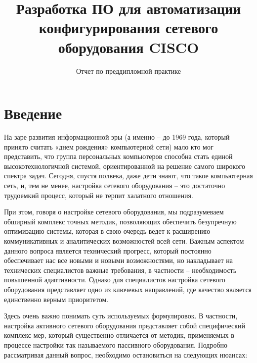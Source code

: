 \documentclass[a4paper,14pt]{extreport}
\begin{document}
	\title{Разработка ПО для автоматизации конфигурирования сетевого оборудования CISCO}
	\subtitle{Отчет по преддипломной практике}
	\maketitle
	\setcounter{page}{2} %
	
	\tableofcontents
	
	\chapter*{Введение}
		
	На заре развития информационной эры (а именно – до 1969 года, который принято считать «днем рождения» компьютерной сети) мало кто мог представить, что группа персональных компьютеров способна стать единой высокотехнологичной системой, ориентированной на решение самого широкого спектра задач. Сегодня, спустя полвека, даже дети знают, что такое компьютерная сеть, и, тем не менее, настройка сетевого оборудования – это достаточно трудоемкий процесс, который не терпит халатного отношения.
	
	При этом, говоря о настройке сетевого оборудования, мы подразумеваем обширный комплекс точных методик, позволяющих обеспечить безупречную оптимизацию системы, которая в свою очередь ведет к расширению коммуникативных и аналитических возможностей всей сети. Важным аспектом данного вопроса является технический прогресс, который постоянно обеспечивает нас все новыми и новыми возможностями, но накладывает на технических специалистов важные требования, в частности – необходимость повышенной адаптивности. Однако для специалистов настройка сетевого оборудования представляет одно из ключевых направлений, где качество является единственно верным приоритетом.
	
	Здесь очень важно понимать суть используемых формулировок. В частности, настройка активного сетевого оборудования представляет собой специфический комплекс мер, который существенно отличается от методик, применяемых в процессе настройки так называемого пассивного оборудования. Подробно рассматривая данный вопрос, необходимо остановиться на следующих нюансах:
	
\end{document}

